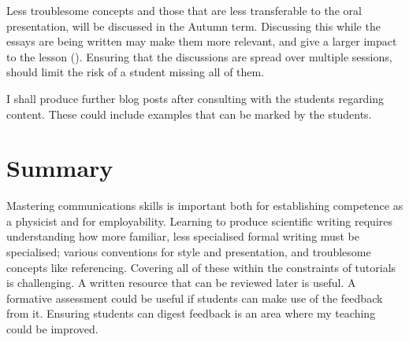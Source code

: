 Less troublesome concepts and those that are less transferable to the oral presentation, will be discussed in the Autumn term. Discussing this while the essays are being written may make them more relevant, and give a larger impact to the lesson (). Ensuring that the discussions are spread over multiple sessions, should limit the risk of a student missing all of them.

I shall produce further blog posts after consulting with the students regarding content. These could include examples that can be marked by the students.

\section{Summary}

Mastering communications skills is important both for establishing competence as a physicist and for employability. Learning to produce scientific writing requires understanding how more familiar, less specialised formal writing must be specialised; various conventions for style and presentation, and troublesome concepts like referencing. Covering all of these within the constraints of tutorials is challenging. A written resource that can be reviewed later is useful. A formative assessment could be useful if students can make use of the feedback from it. Ensuring students can digest feedback is an area where my teaching could be improved.
